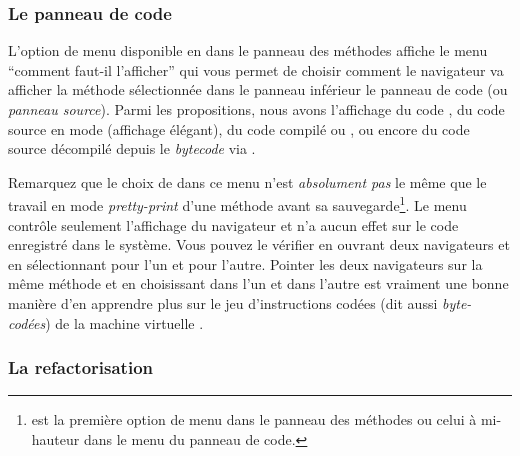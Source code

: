 \documentclass[a4paper,10pt,twoside]{book}
\begin{document}
\subsubsection{Le panneau de code}

L'option de menu  
disponible en \actclickant{} dans le panneau des méthodes
affiche le menu ``comment faut-il l'afficher''
qui vous permet de choisir comment le navigateur va afficher
la méthode sélectionnée dans le panneau inférieur \ie le panneau de code
(ou \emph{panneau source}).
Parmi les propositions, nous avons l'affichage du code , 
du code source en mode  (affichage élégant), 
du code compilé ou , ou encore du code source
décompilé depuis le \emph{bytecode} via .

Remarquez que le choix de  dans ce menu n'est
\emph{absolument pas} le même que le travail en mode \emph{pretty-print} d'une méthode
avant sa sauvegarde\footnote{ est la première option de menu 
dans le panneau des méthodes ou celui à mi-hauteur dans le menu du panneau de code.}.
Le menu contrôle seulement l'affichage du navigateur et n'a aucun effet sur
le code enregistré dans le système.
Vous pouvez le vérifier en ouvrant deux navigateurs et en sélectionnant
 pour l'un et  pour l'autre.
Pointer les deux navigateurs sur la même méthode et en choisissant
 dans l'un et  dans l'autre est vraiment
une bonne manière d'en apprendre plus sur le jeu d'instructions codées
(dit aussi \emph{byte-codées}) de la machine virtuelle \pharo. %

\subsubsection{La refactorisation}
\end{document}
